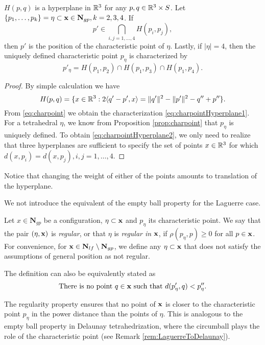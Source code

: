 \begin{proposition}\label{prop:charpointHyperplane} $H(p,q)$ is a hyperplane in ${\mathbb R^3}$ for any $p,q\in{\mathbb R^3}\times S$. Let $\{p_1,\dots,p_k\} =\eta\subset{\mathbf{x}}\in \mathbf N_{gp}, k=2,3,4$. If 
	\begin{equation}\label{eq:charpointHyperplane1}p'\in\bigcap_{i,j=1,\dots,4} H(p_i,p_j),\end{equation}
	then $p'$ is the position of the characteristic point of $\eta$. Lastly, if $|\eta|=4$, then the uniquely defined characteristic point $p_\eta$ is characterized by
	\begin{equation}\label{eq:charpointHyperplane2}p'_\eta = H(p_1,p_2)\cap H(p_1,p_3) \cap H(p_1,p_4).\end{equation}
\end{proposition}
\begin{proof}
	By simple calculation we have
	$$H(p,q) = \{x \in {\mathbb R^3}: 2 \langle q'-p',x \rangle  = \|q'\|^2 - \|p'\|^2  - q'' + p''\}.$$
	From \eqref{eq:charpoint} we obtain the characterization \eqref{eq:charpointHyperplane1}. 
	For a tetrahedral $\eta$, we know from Proposition \ref{prop:charpoint} that $p_\eta$ is uniquely defined. To obtain \eqref{eq:charpointHyperplane2}, we only need to realize that three hyperplanes are sufficient to specify the set of points $x\in {\mathbb R^3}$ for which $d(x,p_i)=d(x,p_j), i,j=1,\dots,4$.
\end{proof}

Notice that changing the weight of either of the points amounts to translation of the hyperplane. \newline

\noindent We not introduce the equivalent of the empty ball property for the Laguerre case.


\begin{definition}
	Let $x\in \mathbf N_{gp}$ be a configuration, $\eta \subset {\mathbf{x}}$ and $p_\eta$ its characteristic point. We say that the pair $(\eta,{\mathbf{x}})$ is \textit{regular}, or that $\eta$ is \textit{regular in} ${\mathbf{x}}$, if $\rho(p_\eta,p)\geq 0$ for all $p\in{\mathbf{x}}$.	
	For convenience, for ${\mathbf{x}} \in \mathbf N_{lf}\setminus \mathbf N_{gp}$, we define any $\eta\subset {\mathbf{x}}$ that does not satisfy the assumptions of general position as not regular.
\end{definition}
The definition can also be equivalently stated as 
$$\text{There is no point } q\in{\mathbf{x}} \text{ such that } d(p'_\eta,q)<p''_\eta.$$

The regularity property ensures that no point of ${\mathbf{x}}$ is closer to the characteristic point $p_\eta$ in the power distance than the points of $\eta$. This is analogous to the empty ball property in Delaunay tetrahedrization, where the circumball plays the role of the characteristic point (see Remark \ref{rem:LaguerreToDelaunay}).




